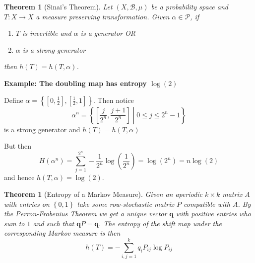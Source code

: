 \documentclass[11pt]{article}
\newcommand{\relmiddle}[1]{\mathrel{}\middle#1\mathrel{}}
\newcommand{\rmv}{\relmiddle|}
\newcommand{\mv}[1]{\textbf{#1}}
\newenvironment{eg}
	{\begin{mdframed}[backgroundcolor=mylg,roundcorner=5pt,linewidth=0pt]\bfseries{Example:}\normalfont}
	{\end{mdframed}}
\newtheorem{theorem}[prop]{Theorem}
\begin{document}
\begin{theorem}[Sinai's Theorem]
Let $(X, \mathcal{B}, \mu)$ be a probability space and $T:X \to X$ a measure preserving transformation.
Given $\alpha\in\mathcal{P}$, if
\begin{enumerate}
	\item $T$ is invertible and $\alpha$ is a generator OR
	\item $\alpha$ is a strong generator
\end{enumerate}
then $h(T) = h(T, \alpha)$.
\end{theorem}

\begin{eg}
	\textbf{The doubling map has entropy $\log(2)$}

	Define $\alpha = \left\{ \left[ 0, \frac{1}{2}\right], \left[ \frac{1}{2}, 1\right]\right\}$.
	Then notice
	\[
		\alpha^n = \left\{ \left[ \frac{j}{2^n}, \frac{j+1}{2^n}\right] \rmv 0 \leq j \leq 2^n -1\right\}
	\]
	is a strong generator and $h(T) = h(T, \alpha)$

	But then
	\[
		H(\alpha^n) = \sum_{j=1}^{2^n}-\frac{1}{2^n}\log\left(\frac{1}{2^n}\right)=\log(2^n) = n\log(2)
	\]
	and hence $h(T, \alpha) = \log(2)$.
\end{eg}

\begin{theorem}[Entropy of a Markov Measure]
Given an aperiodic $k\times k$ matrix $A$ with entries on $\left\{ 0, 1\right\}$ take some row-stochastic matrix $P$ compatible with $A$.
By the Perron-Frobenius Theorem we get a unique vector $\mv{q}$ with positive entries who sum to $1$ and such that $\mv{q}P = \mv{q}$.
The entropy of the shift map under the corresponding Markov measure is then
\[
	h(T) = -\sum_{i, j=1}^{k}q_i P_{ij}\log P_{ij}
\]
\end{theorem}
\end{document}
